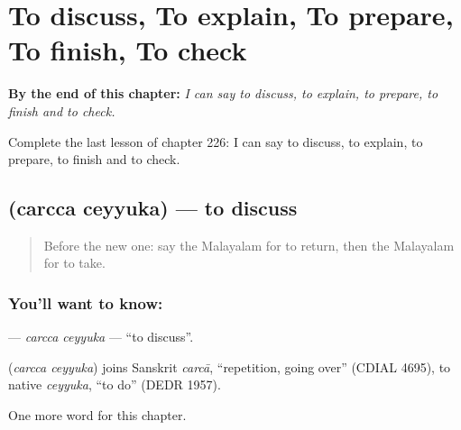 
\chapter{To discuss, To explain, To prepare, To finish, To check}
\label{ch:ml-to-discuss-to-explain-to-prepare-to-finish-to-check}

\begin{chapteropening}
\textbf{By the end of this chapter:} \emph{I can say to discuss, to explain, to prepare, to finish and to check.}

Complete the last lesson of chapter 226: I can say to discuss, to explain, to prepare, to finish and to check.
\end{chapteropening}

\section[\texorpdfstring{\ml{ചർച്ച} \ml{ചെയ്യുക} (carcca ceyyuka)}{ചർച്ച ചെയ്യുക (carcca ceyyuka)}]{  (carcca ceyyuka) — to discuss}

\label{lesson:ML-C226-carcca-ceyyuka}



\begin{quote}
Before the new one: say the Malayalam for to return, then the Malayalam for to take.
\end{quote}

\subsection*{You'll want to know:  }
\textbf{ } — \emph{carcca ceyyuka} — \textquotedblleft{}to discuss\textquotedblright{}.

\begin{cousinweb}
\textbf{ } (\emph{carcca ceyyuka}) joins Sanskrit \emph{carcā}, \textquotedblleft{}repetition, going over\textquotedblright{} (CDIAL 4695), to native \emph{ceyyuka}, \textquotedblleft{}to do\textquotedblright{} (DEDR 1957).
\end{cousinweb}

\begin{grammarlens}[title={What you've built}]
One more word for this chapter.
\end{grammarlens}

